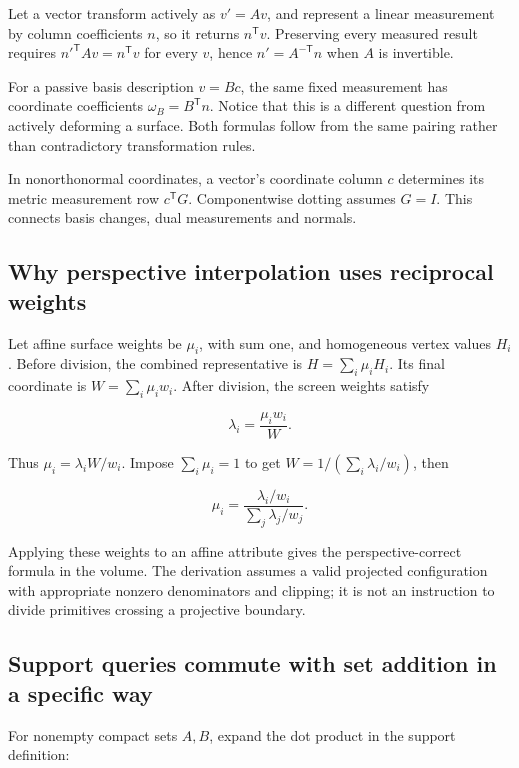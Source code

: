 Let a vector transform actively as \(v'=Av\), and represent a linear measurement by column coefficients \(n\), so it returns \(n^\mathsf Tv\). Preserving every measured result requires \(n'^\mathsf TAv=n^\mathsf Tv\) for every \(v\), hence \(n'=A^{-\mathsf T}n\) when \(A\) is invertible.

For a passive basis description \(v=Bc\), the same fixed measurement has coordinate coefficients \(\omega_B=B^\mathsf Tn\). Notice that this is a different question from actively deforming a surface. Both formulas follow from the same pairing rather than contradictory transformation rules.

In nonorthonormal coordinates, a vector's coordinate column \(c\) determines its metric measurement row \(c^\mathsf TG\). Componentwise dotting assumes \(G=I\). This connects basis changes, dual measurements and normals.

\subsection{Why perspective interpolation uses reciprocal weights}\label{02-foundations-ii-ch039-why-perspective-interpolation-uses-reciprocal-weights}

Let affine surface weights be \(\mu_i\), with sum one, and homogeneous vertex values \(H_i\). Before division, the combined representative is \(H=\sum_i\mu_iH_i\). Its final coordinate is \(W=\sum_i\mu_iw_i\). After division, the screen weights satisfy

\[
\lambda_i=\frac{\mu_iw_i}{W}.
\]

Thus \(\mu_i=\lambda_iW/w_i\). Impose \(\sum_i\mu_i=1\) to get \(W=1/(\sum_i\lambda_i/w_i)\), then

\[
\mu_i=\frac{\lambda_i/w_i}{\sum_j\lambda_j/w_j}.
\]

Applying these weights to an affine attribute gives the perspective-correct formula in the volume. The derivation assumes a valid projected configuration with appropriate nonzero denominators and clipping; it is not an instruction to divide primitives crossing a projective boundary.

\subsection{Support queries commute with set addition in a specific way}\label{02-foundations-ii-ch039-support-queries-commute-with-set-addition-in-a-specific-way}

For nonempty compact sets \(A,B\), expand the dot product in the support definition:

